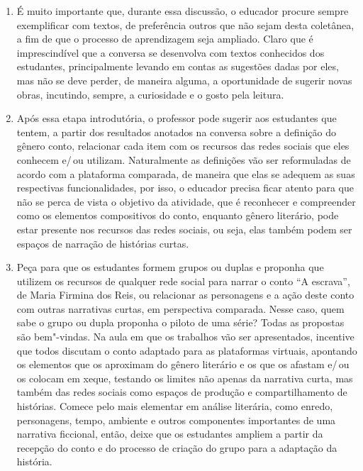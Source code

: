 \documentclass[12pt]{extarticle}
\begin{document}
\begin{enumerate}

\item
É muito importante que, durante essa discussão, o educador procure
sempre exemplificar com textos, de preferência outros que não sejam
desta coletânea, a fim de que o processo de aprendizagem seja ampliado.
Claro que é imprescindível que a conversa se desenvolva com textos
conhecidos dos estudantes, principalmente levando em contas as sugestões
dadas por eles, mas não se deve perder, de maneira alguma, a
oportunidade de sugerir novas obras, incutindo, sempre, a curiosidade e
o gosto pela leitura.

\item
Após essa etapa introdutória, o professor pode sugerir aos estudantes
que tentem, a partir dos resultados anotados na conversa sobre a
definição do gênero conto, relacionar cada item com os recursos das
redes sociais que eles conhecem e/\,ou utilizam. Naturalmente as
definições vão ser reformuladas de acordo com a plataforma comparada, de
maneira que elas se adequem as suas respectivas funcionalidades, por
isso, o educador precisa ficar atento para que não se perca de vista o
objetivo da atividade, que é reconhecer e compreender como os elementos
compositivos do conto, enquanto gênero literário, pode estar presente
nos recursos das redes sociais, ou seja, elas também podem ser espaços
de narração de histórias curtas.

\item
Peça para que os estudantes formem grupos ou duplas e proponha que
utilizem os recursos de qualquer rede social para narrar o conto ``A
escrava'', de Maria Firmina dos Reis, ou relacionar as personagens e a
ação deste conto com outras narrativas curtas, em perspectiva comparada.
Nesse caso, quem sabe o grupo ou dupla proponha o piloto de uma série?
Todas as propostas são bem"-vindas. Na aula em que os trabalhos vão ser
apresentados, incentive que todos discutam o conto adaptado para as
plataformas virtuais, apontando os elementos que os aproximam do gênero
literário e os que os afastam e/\,ou os colocam em xeque, testando os
limites não apenas da narrativa curta, mas também das redes sociais como
espaços de produção e compartilhamento de histórias. Comece pelo mais
elementar em análise literária, como enredo, personagens, tempo,
ambiente e outros componentes importantes de uma narrativa ficcional,
então, deixe que os estudantes ampliem a partir da recepção do conto e
do processo de criação do grupo para a adaptação da história.
\end{enumerate}
\end{document}
